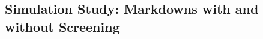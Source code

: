 \documentclass[11pt]{article}
\begin{document}







\subsection{Simulation Study: Markdowns with and without Screening}
\end{document}
